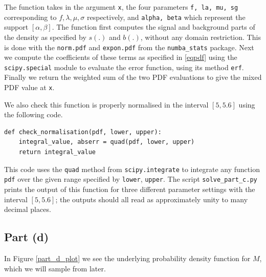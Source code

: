 \documentclass[12pt]{article}
\begin{document}
The function takes in the argument \texttt{x}, the four parameters \texttt{f, la, mu, sg} corresponding to $f, \lambda, \mu, \sigma$ respectively, and \texttt{alpha, beta} which represent the support $[\alpha,\beta]$.
The function first computes the signal and background parts of the density as specified by $s(.)$ and $b(.)$, without any domain restriction.
This is done with the \texttt{norm.pdf} and \texttt{expon.pdf} from the \texttt{numba\_stats} package.
Next we compute the coefficients of these terms as specified in \eqref{eqpdf} using the \texttt{scipy.special} module to evaluate the error function, using its method \texttt{erf}.
Finally we return the weighted sum of the two PDF evaluations to give the mixed PDF value at \texttt{x}.

We also check this function is properly normalised in the interval $[5, 5.6]$ using the following code.

\begin{lstlisting}[caption=Function checking the normalisation of the PDF for part (c).]
def check_normalisation(pdf, lower, upper):
    integral_value, abserr = quad(pdf, lower, upper)
    return integral_value
\end{lstlisting}

This code uses the \texttt{quad} method from \texttt{scipy.integrate} to integrate any function \texttt{pdf} over the given range specified by \texttt{lower}, \texttt{upper}.
The script \texttt{solve\_part\_c.py} prints the output of this function for three different parameter settings with the interval $[5, 5.6]$; the outputs should all read as approximately unity to many decimal places.

\subsection*{Part (d)}

In Figure \ref{part_d_plot} we see the underlying probability density function for $M$, which we will sample from later.
\end{document}
